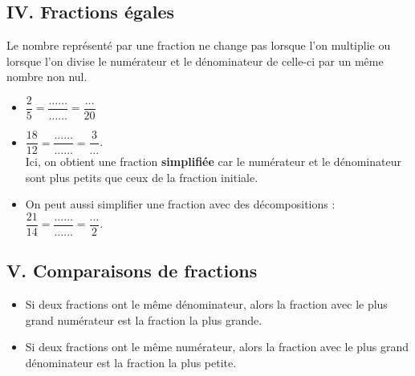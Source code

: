 \vspace{0.8cm}
\subsection*{IV. Fractions égales}

\begin{Propriété}
Le nombre représenté par une fraction ne change pas lorsque l'on multiplie ou lorsque l'on divise le numérateur et le dénominateur de celle-ci par un même nombre non nul.
\end{Propriété}


\begin{Exemples}
\begin{itemize}[label=\textcolor{Couleur8}{$\bullet$}]
\item $\dfrac{2}{5}= \dfrac{\ldots\ldots}{\ldots\ldots} = \dfrac{\ldots}{20}$

\item $ \dfrac{18}{12} = \dfrac{\ldots\ldots}{\ldots\ldots} = \dfrac{3}{\ldots}$.\\
 Ici, on obtient une fraction \textbf{simplifiée} car le numérateur et le dénominateur sont plus petits que ceux de la fraction initiale.

\item On peut aussi simplifier une fraction avec des décompositions : $ \dfrac{21}{14} = \dfrac{\ldots\ldots}{\ldots\ldots} = \dfrac{\ldots}{2}$.
\end{itemize}
\end{Exemples}


\newpage

\subsection*{V. Comparaisons de fractions}



\begin{Propriétés*}[c]
\leavevmode\vspace{-\baselineskip}
\begin{itemize}[label=\textcolor{Couleur1}{$\bullet$}]
\item Si deux fractions ont le même dénominateur, alors la fraction avec le plus grand numérateur est la fraction la plus grande.

\item Si deux fractions ont le même numérateur, alors la fraction avec le plus grand dénominateur est la fraction la plus petite.
\end{itemize}
\end{Propriétés*}

